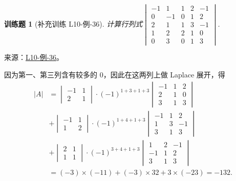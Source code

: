 \documentclass[12pt,fontset=fandol]{ctexart}
\newtheorem{exercise}{训练题}[section]
\begin{document}
\begin{exercise}[补充训练 L10-例-36]\label{prob:L10-例-36}
计算行列式$\begin{vmatrix}
            -1 & 1  & 1 & 2 & -1 \\
            0  & -1 & 0 & 1 & 2  \\
            2  & 1  & 1 & 3 & -1 \\
            1  & 2  & 2 & 1 & 0  \\
            0  & 3  & 0 & 1 & 3
        \end{vmatrix}$.
\end{exercise}
\noindent 来源：\href{https://github.com/yhwu-is/Linear-Algebra-Left-Undone/blob/new/%E8%AE%B2%E4%B9%89/%E4%B8%93%E9%A2%98/10%20%E8%A1%8C%E5%88%97%E5%BC%8F.tex}{L10-例-36}。
\begin{solve}
因为第一、第三列含有较多的 $0$，因此在这两列上做 Laplace 展开，得
    \begin{align*}
        |A| & = \begin{vmatrix}
                    -1 & 1 \\ 2 & 1
                \end{vmatrix} \cdot (-1)^{1+3+1+3}
        \begin{vmatrix}
            -1 & 1 & 2 \\ 2 & 1 & 0 \\ 3 & 1 & 3
        \end{vmatrix}                                 \\
            & + \begin{vmatrix}
                    -1 & 1 \\ 1 & 2
                \end{vmatrix} \cdot (-1)^{1+4+1+3}
        \begin{vmatrix}
            -1 & 1 & 2 \\ 1 & 3 & -1 \\ 3 & 1 & 3
        \end{vmatrix}                                \\
            & + \begin{vmatrix}
                    2 & 1 \\ 1 & 1
                \end{vmatrix} \cdot (-1)^{3+4+1+3}
        \begin{vmatrix}
            1 & 2 & -1 \\ -1 & 1 & 2 \\ 3 & 1 & 3
        \end{vmatrix}                                \\
            & = (-3) \times (-11) + (-3) \times 32 + 3 \times (-23) = -132.
    \end{align*}
\end{solve}
\end{document}
